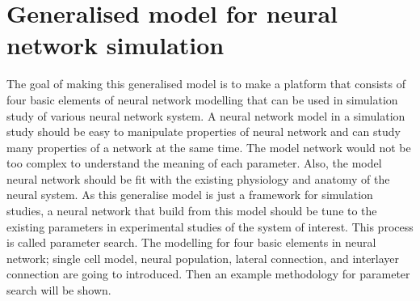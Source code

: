 %


\section{Generalised model for neural network simulation}
The goal of making this generalised model is to make a platform that consists of four basic elements of neural network modelling that can be used in simulation study of various neural network system. A neural network model in a simulation study should be easy to manipulate properties of neural network and can study many properties of a network at the same time.  The model network would not be too complex to understand the meaning of each parameter. 
Also, the model neural network should be fit with the existing physiology and anatomy of the neural system.
As this generalise model is just a framework for simulation studies, a neural network that build from this model should be tune to the existing parameters in experimental studies of the system of interest. This process is called parameter search.
The modelling for four basic elements in neural network; single cell model, neural population, lateral connection, and interlayer connection are going to introduced. Then an example methodology for parameter search will be shown.

